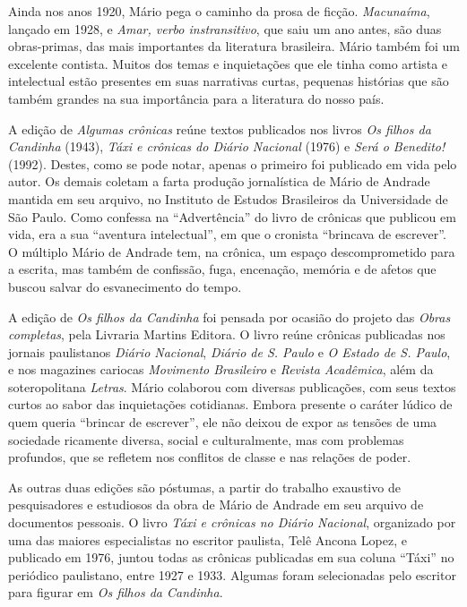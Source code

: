 \documentclass[12pt]{extarticle}
\begin{document}
Ainda nos anos 1920, Mário pega o caminho da prosa de ficção. 
\emph{Macunaíma}, lançado em 1928, e \emph{Amar, verbo instransitivo}, 
que saiu um ano antes, são duas obras-primas, das mais importantes da literatura
brasileira. Mário também foi um excelente contista. Muitos dos
temas e inquietações que ele tinha como artista e intelectual estão presentes
em suas narrativas curtas, pequenas histórias que são também
grandes na sua importância para a literatura do nosso país.




A edição de \emph{Algumas crônicas} reúne textos publicados nos livros
\emph{Os filhos da Candinha} (1943), \emph{Táxi e crônicas do Diário
Nacional} (1976) e \emph{Será o Benedito!} (1992). Destes, como se pode
notar, apenas o primeiro foi publicado em vida pelo autor. Os demais
coletam a farta produção jornalística de Mário de Andrade mantida em seu
arquivo, no Instituto de Estudos Brasileiros da Universidade de São
Paulo. Como confessa na ``Advertência'' do livro de crônicas que
publicou em vida, era a sua ``aventura intelectual'', em que o cronista
``brincava de escrever''. O múltiplo Mário de Andrade tem, na crônica,
um espaço descomprometido para a escrita, mas também de confissão, fuga,
encenação, memória e de afetos que buscou salvar do esvanecimento do
tempo.

A edição de \emph{Os filhos da Candinha} foi pensada por ocasião do
projeto das \emph{Obras completas}, pela Livraria Martins Editora. O
livro reúne crônicas publicadas nos jornais paulistanos \emph{Diário
Nacional}, \emph{Diário de S. Paulo} e \emph{O Estado de S. Paulo}, e
nos magazines cariocas \emph{Movimento Brasileiro} e \emph{Revista
Acadêmica}, além da soteropolitana \emph{Letras}. Mário colaborou com
diversas publicações, com seus textos curtos ao sabor das
inquietações cotidianas. Embora presente o caráter lúdico de quem queria
``brincar de escrever'', ele não deixou de expor as tensões de uma
sociedade ricamente diversa, social e culturalmente, mas com problemas
profundos, que se refletem nos conflitos de classe e nas
relações de poder.

As outras duas edições são póstumas, a partir do trabalho exaustivo de
pesquisadores e estudiosos da obra de Mário de Andrade em seu arquivo de
documentos pessoais. O livro \emph{Táxi e crônicas no Diário Nacional},
organizado por uma das maiores especialistas no escritor paulista, Telê
Ancona Lopez, e publicado em 1976, juntou todas as crônicas publicadas
em sua coluna ``Táxi'' no periódico paulistano, entre 1927 e 1933.
Algumas foram selecionadas pelo escritor para figurar em \emph{Os filhos
da Candinha}.
\end{document}
